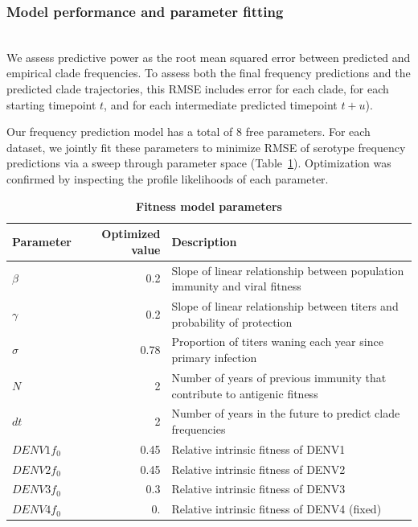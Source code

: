 \documentclass[11pt,oneside,letterpaper]{article}
\begin{document}
\subsubsection{Model performance and parameter fitting}\\
We assess predictive power as the root mean squared error between predicted and empirical clade frequencies.
To assess both the final frequency predictions and the predicted clade trajectories, this RMSE includes error for each clade, for each starting timepoint $t$, and for each intermediate predicted timepoint $t+u$).

Our frequency prediction model has a total of 8 free parameters.
For each dataset, we jointly fit these parameters to minimize RMSE of serotype frequency predictions via a sweep through parameter space (Table~\ref{fitness_model_parameters}).
Optimization was confirmed by inspecting the profile likelihoods of each parameter.

\begin{table}[ht!]
  \begin{center}
    \label{fitness_model_parameters}
    \begin{tabular}{l|r|l}
      Parameter & Optimized value & Description\\
      \hline
      $\beta$ & 0.2 & Slope of linear relationship between population immunity and viral fitness\\
      $\gamma$ & 0.2 & Slope of linear relationship between titers and probability of protection\\
      $\sigma$ & 0.78 & Proportion of titers waning each year since primary infection\\
      $N$ & 2 & Number of years of previous immunity that contribute to antigenic fitness\\
      $dt$ & 2 & Number of years in the future to predict clade frequencies\\
      $DENV1 f_{0}$ & 0.45 & Relative intrinsic fitness of DENV1\\
      $DENV2 f_{0}$ & 0.45 & Relative intrinsic fitness of DENV2\\
      $DENV3 f_{0}$ & 0.3 & Relative intrinsic fitness of DENV3\\
      $DENV4 f_{0}$ & 0. & Relative intrinsic fitness of DENV4 (fixed)\\
    \end{tabular}
    \caption{
    \textbf{Fitness model parameters}
    }
  \end{center}
\end{table}
\end{document}
